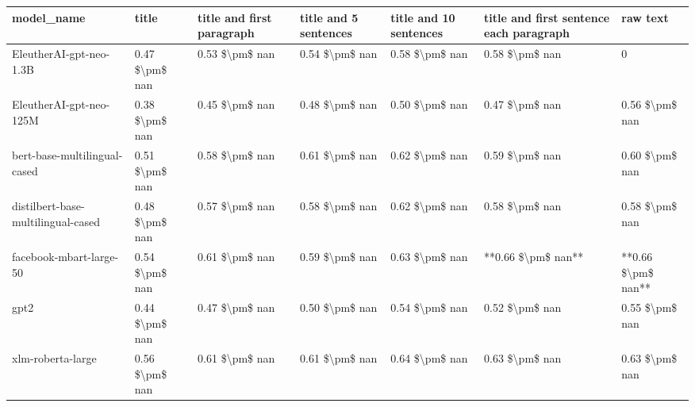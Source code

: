 \begin{tabular}{lllllll}
\toprule
                        model\_name &          title & title and first paragraph & title and 5 sentences & title and 10 sentences & title and first sentence each paragraph &           raw text \\
\midrule
           EleutherAI-gpt-neo-1.3B & 0.47 \$\textbackslash pm\$ nan &            0.53 \$\textbackslash pm\$ nan &        0.54 \$\textbackslash pm\$ nan &         0.58 \$\textbackslash pm\$ nan &                          0.58 \$\textbackslash pm\$ nan &                  0 \\
           EleutherAI-gpt-neo-125M & 0.38 \$\textbackslash pm\$ nan &            0.45 \$\textbackslash pm\$ nan &        0.48 \$\textbackslash pm\$ nan &         0.50 \$\textbackslash pm\$ nan &                          0.47 \$\textbackslash pm\$ nan &     0.56 \$\textbackslash pm\$ nan \\
      bert-base-multilingual-cased & 0.51 \$\textbackslash pm\$ nan &            0.58 \$\textbackslash pm\$ nan &        0.61 \$\textbackslash pm\$ nan &         0.62 \$\textbackslash pm\$ nan &                          0.59 \$\textbackslash pm\$ nan &     0.60 \$\textbackslash pm\$ nan \\
distilbert-base-multilingual-cased & 0.48 \$\textbackslash pm\$ nan &            0.57 \$\textbackslash pm\$ nan &        0.58 \$\textbackslash pm\$ nan &         0.62 \$\textbackslash pm\$ nan &                          0.58 \$\textbackslash pm\$ nan &     0.58 \$\textbackslash pm\$ nan \\
           facebook-mbart-large-50 & 0.54 \$\textbackslash pm\$ nan &            0.61 \$\textbackslash pm\$ nan &        0.59 \$\textbackslash pm\$ nan &         0.63 \$\textbackslash pm\$ nan &                      **0.66 \$\textbackslash pm\$ nan** & **0.66 \$\textbackslash pm\$ nan** \\
                              gpt2 & 0.44 \$\textbackslash pm\$ nan &            0.47 \$\textbackslash pm\$ nan &        0.50 \$\textbackslash pm\$ nan &         0.54 \$\textbackslash pm\$ nan &                          0.52 \$\textbackslash pm\$ nan &     0.55 \$\textbackslash pm\$ nan \\
                 xlm-roberta-large & 0.56 \$\textbackslash pm\$ nan &            0.61 \$\textbackslash pm\$ nan &        0.61 \$\textbackslash pm\$ nan &         0.64 \$\textbackslash pm\$ nan &                          0.63 \$\textbackslash pm\$ nan &     0.63 \$\textbackslash pm\$ nan \\
\bottomrule
\end{tabular}
